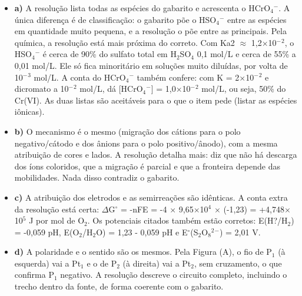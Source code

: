 \documentclass{article}%
\begin{document}
\begin{itemize}%
\item%
\textbf{a)} A resolução lista todas as espécies do gabarito e acrescenta o HCrO$_{4}$$^{-}$. A única diferença é de classificação: o gabarito põe o HSO$_{4}$$^{-}$ entre as espécies em quantidade muito pequena, e a resolução o põe entre as principais. Pela química, a resolução está mais próxima do correto. Com Ka2 $\approx$ 1,2$\times$10$^{-}$$^2$, o HSO$_{4}$$^{-}$ é cerca de 90\% do sulfato total em H$_{2}$SO$_{4}$ 0,1 mol/L e cerca de 55\% a 0,01 mol/L. Ele só fica minoritário em soluções muito diluídas, por volta de 10$^{-}$$^3$ mol/L. A conta do HCrO$_{4}$$^{-}$ também confere: com K = 2$\times$10$^{-}$$^2$ e dicromato a 10$^{-}$$^2$ mol/L, dá {[}HCrO$_{4}$$^{-}${]} = 1,0$\times$10$^{-}$$^2$ mol/L, ou seja, 50\% do Cr(VI). As duas listas são aceitáveis para o que o item pede (listar as espécies iônicas).%
\item%
\textbf{b)} O mecanismo é o mesmo (migração dos cátions para o polo negativo/cátodo e dos ânions para o polo positivo/ânodo), com a mesma atribuição de cores e lados. A resolução detalha mais: diz que não há descarga dos íons coloridos, que a migração é parcial e que a fronteira depende das mobilidades. Nada disso contradiz o gabarito.%
\item%
\textbf{c)} A atribuição dos eletrodos e as semirreações são idênticas. A conta extra da resolução está certa: $\Delta$G$^\circ$ = -nFE = -4 $\times$ 9,65$\times$10$^{4}$ $\times$ (-1,23) = +4,748$\times$10$^{5}$ J por mol de O$_{2}$. Os potenciais citados também estão corretos: E(H?/H$_{2}$) = -0,059 pH, E(O$_{2}$/H$_{2}$O) = 1,23 - 0,059 pH e E$^\circ$(S$_{2}$O$_{8}$$^2$$^{-}$) = 2,01 V.%
\item%
\textbf{d)} A polaridade e o sentido são os mesmos. Pela Figura (A), o fio de P$_{1}$ (à esquerda) vai a Pt$_{1}$ e o de P$_{2}$ (à direita) vai a Pt$_{2}$, sem cruzamento, o que confirma P$_{1}$ negativo. A resolução descreve o circuito completo, incluindo o trecho dentro da fonte, de forma coerente com o gabarito.%
\end{itemize}%
\end{document}
